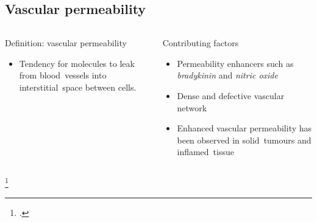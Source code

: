 \documentclass[aspectratio=169,compress]{beamer}
\begin{document}
\subsection{Vascular permeability}
\begin{frame}{\subsecname}
  \begin{columns}
      \begin{block}{Definition: vascular permeability}
        \begin{itemize}
          \item Tendency for molecules to leak from \alert{blood~vessels} into \alert{interstitial~space} between cells.
        \end{itemize}
      \end{block}

      \begin{block}{Contributing factors}
        \begin{itemize}
          \item Permeability enhancers such as \emph{bradykinin} and \emph{nitric oxide}
          \item Dense and defective vascular network
          \item Enhanced vascular permeability has been observed in \alert{solid~tumours} and \alert{inflamed~tissue}~
        \end{itemize}
      \end{block}

  \end{columns}
  \footcitetext{maeda2000tumor}
\end{frame}
\end{document}

